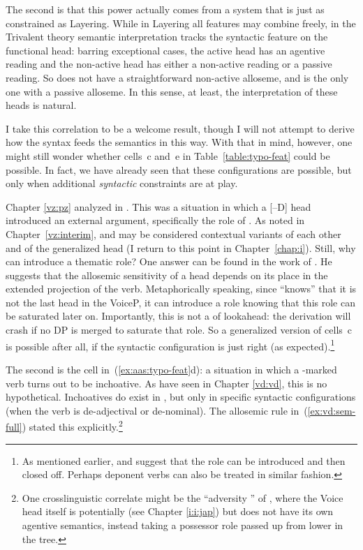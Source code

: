 \begin{exe}
\begin{xlist}
\begin{exe}
\begin{exe}
\begin{xlist}
\begin{exe}
\begin{exe}
\begin{exe}
\begin{exe}
\begin{exe}
\begin{xlist}
\label{r1:6:2}The second is that this power actually comes from a system that is just as constrained as Layering. While in Layering all features may combine freely, in the Trivalent theory semantic interpretation tracks the syntactic feature on the functional head: barring exceptional cases, the active head {\vd} has an agentive reading and the non-active head {\vz} has either a non-active reading or a passive reading. So {\vd} does not have a straightforward non-active alloseme, and {\vz} is the only one with a passive alloseme. In this sense, at least, the interpretation of these heads is natural.

I take this correlation to be a welcome result, though I will not attempt to derive how the syntax feeds the semantics in this way. With that in mind, however, one might still wonder whether cells~c and~e in Table~\ref{table:typo-feat} could be possible. In fact, we have already seen that these configurations are possible, but only when additional \emph{syntactic} constraints are at play.

Chapter \ref{vz:pz} analyzed  in {\tnif}. This was a situation in which a [--D] head introduced an external argument, specifically the  role of {\pz}. As noted in Chapter~\ref{vz:interim}, {\pz} and {\vz} may be considered contextual variants of each other and of the generalized head \emph{} (I return to this point in Chapter~\ref{chap:i}). Still, why can {\pz} introduce a thematic role? One answer can be found in the work of \cite{wood15springer}. He suggests that the allosemic sensitivity of a head depends on its place in the extended projection of the verb. Metaphorically speaking, since {\pz} ``knows'' that it is not the last head in the VoiceP, it can introduce a  role knowing that this role can be saturated later on. Importantly, this is not a  of lookahead: the derivation will crash if no DP is merged to saturate that role. So a generalized version of cells~c is possible after all, if the syntactic configuration is just right (as expected).\footnote{As mentioned earlier, \cite{legate14} and \cite{akkus19jl} suggest that the  role can be introduced and then closed off. Perhaps deponent verbs can also be treated in similar fashion.}

The second  is the cell in~(\ref{ex:aas:typo-feat}d): a situation in which a -marked verb turns out to be inchoative. As have seen in Chapter \ref{vd:vd}, this is no hypothetical. Inchoatives do exist in {\thif}, but only in specific syntactic configurations (when the verb is de-adjectival or de-nominal). The allosemic rule in~(\ref{ex:vd:sem-full}) stated this explicitly.\footnote{One crosslinguistic correlate might be the ``adversity '' of  \citep{pylkkanen08,woodmarantz17}, where the Voice head itself is potentially {\vd} (see Chapter \ref{i:i:jap}) but does not have its own agentive semantics, instead taking a possessor role passed up from lower in the tree.}


\end{xlist}
\end{exe}
\end{exe}
\end{exe}
\end{exe}
\end{exe}
\end{xlist}
\end{exe}
\end{exe}
\end{xlist}
\end{exe}
